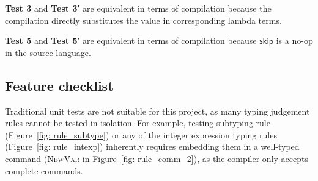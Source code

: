 \documentclass[12pt,a4paper]{report}
\theoremstyle{definition}
\begin{document}
    \textbf{Test 3} and \textbf{Test 3′} are equivalent in terms of compilation because the compilation directly substitutes the value in corresponding lambda terms. 
    
    \textbf{Test 5} and \textbf{Test 5′} are equivalent in terms of compilation because $\mathsf{skip}$ is a no-op in the source language.

    \subsection{Feature checklist}
    Traditional unit tests are not suitable for this project, as many typing judgement rules cannot be tested in isolation. For example, testing subtyping rule (Figure~\ref{fig: rule_subtype}) or any of the integer expression typing rules (Figure~\ref{fig: rule_intexp}) inherently requires embedding them in a well-typed command (\textsc{NewVar} in Figure~\ref{fig: rule_comm_2}), as the compiler only accepts complete commands. 
\end{document}
